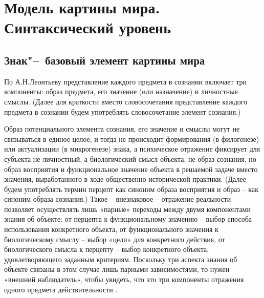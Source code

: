 \chapter{Модель картины мира. Синтаксический уровень} \label{chapt2}

\section{Знак"--~базовый элемент картины мира} \label{sect2_1}

По А.Н.Леонтьеву \cite{Leontiev1975} представление каждого предмета в сознании включает три компоненты: образ предмета, его значение (или назначение) и личностные смыслы. (Далее для краткости вместо словосочетания представление каждого предмета в сознании будем употреблять словосочетание элемент сознания.)

Образ потенциального элемента сознания, его значение и смыслы могут не связываться в единое целое, и тогда не происходит формирования (в филогенезе) или актуализации (в микрогенезе) знака, а психическое отражение фиксирует для субъекта не личностный, а биологический смысл объекта, не образ сознания, но образ восприятия и функциональное значение объекта в решаемой задаче вместо значения, выработанного в ходе общественно-исторической практики. (Далее будем употреблять термин перцепт как синоним образа восприятия и образ – как синоним образа сознания.) Такое – внезнаковое – отражение реальности позволяет осуществлять лишь «парные» переходы между двумя компонентами знания об объекте: от перцепта к функциональному значению – выбор способа использования конкретного объекта, от функционального значения к биологическому смыслу – выбор «цели» для конкретного действия, от биологического смысла к перцепту – выбор конкретного объекта, удовлетворяющего заданным критериям. Поскольку три аспекта знания об объекте связаны в этом случае лишь парными зависимостями, то нужен «внешний наблюдатель», чтобы увидеть, что это три компоненты отражения одного предмета действительности \cite{Chudova2012}.


